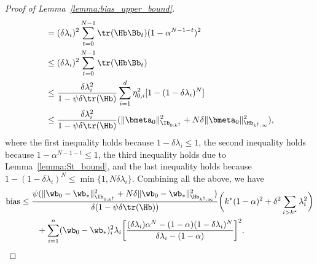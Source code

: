 \documentclass[11pt]{article}
\begin{document}
\begin{proof}[Proof of Lemma~\ref{lemma:bias_upper_bound}]
\begin{align*}
&=(\delta\lambda_i)^2\sum_{t=0}^{N-1}\tr(\Hb\Bb_t)(1-\alpha^{N-1-t})^2\\
&\le(\delta\lambda_i)^2\sum_{t=0}^{N-1}\tr(\Hb\Bb_t)\\
&\le\frac{\delta\lambda_i^2}{1-\psi\delta\tr(\Hb)}\sum_{i=1}^d\eta_{0, i}^2[1-(1-\delta\lambda_i)^N]\\
&\le\frac{\delta\lambda_i^2}{1-\psi\delta\tr(\Hb)}(\|\bmeta_0\|_{\Ib_{0:k^\dagger}}^2+N\delta\|\bmeta_0\|_{\Hb_{k^\dagger:\infty}}^2),
\end{align*}
where the first inequality holds because $1-\delta\lambda_i\le1$, the second inequality holds because $1-\alpha^{N-1-t}\le1$, the third inequality holds due to Lemma~\ref{lemma:St_bound}, and the last inequality holds because $1-(1-\delta\lambda_i)^N\le\min\{1, N\delta\lambda_i\}$. Combining all the above, we have
\begin{align*}
\mathrm{bias}&\le\frac{\psi(\|\wb_0-\wb_*\|_{\Ib_{0:k^\dagger}}^2+N\delta\|\wb_0-\wb_*\|_{\Hb_{k^\dagger:\infty}}^2)}{\delta(1-\psi\delta\tr(\Hb))}\bigg(k^*(1-\alpha)^2+\delta^2\sum_{i>k^*}\lambda_i^2\bigg)\\
&\qquad+\sum_{i=1}^n(\wb_0-\wb_*)_i^2\lambda_i\bigg[\frac{(\delta\lambda_i)\alpha^N-(1-\alpha)(1-\delta\lambda_i)^N}{\delta\lambda_i-(1-\alpha)}\bigg]^2.
\end{align*}


\end{proof}
\end{document}
